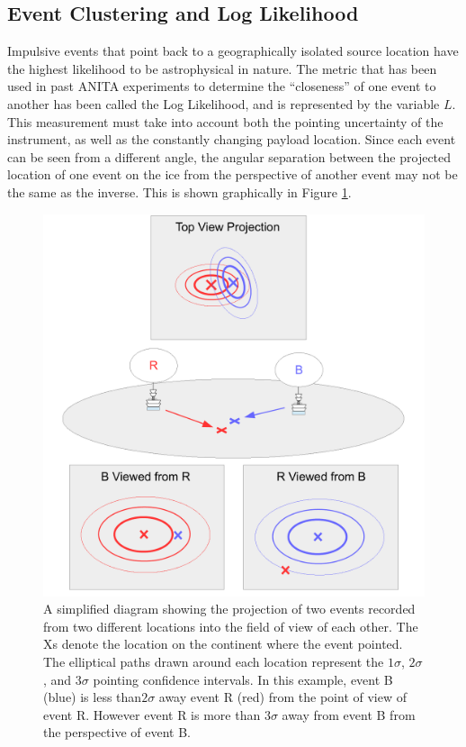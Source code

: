	
	\subsection{Event Clustering and Log Likelihood}
		Impulsive events that point back to a geographically isolated source location have the highest likelihood to be astrophysical in nature.  The metric that has been used in past ANITA experiments to determine the ``closeness'' of one event to another has been called the Log Likelihood, and is represented by the variable $L$.  This measurement must take into account both the pointing uncertainty of the instrument, as well as the constantly changing payload location.  Since each event can be seen from a different angle, the angular separation between the projected location of one event on the ice from the perspective of another event may not be the same as the inverse.  This is shown graphically in Figure \ref{fig:clusteringProjection}.  

\begin{figure}
	\centering
	\includegraphics[width=\textwidth]{figures/clusteringProjection}
	\caption{A simplified diagram showing the projection of two events recorded from two different locations into the field of view of each other.  The Xs denote the location on the continent where the event pointed.  The elliptical paths drawn around each location represent the $1\sigma$, $2\sigma$, and $3\sigma$ pointing confidence intervals.  In this example, event B (blue) is less than$2\sigma$ away event R (red) from the point of view of event R.  However event R is more than $3\sigma$ away from event B from the perspective of event B.} 
	\label{fig:clusteringProjection}
\end{figure}
		
